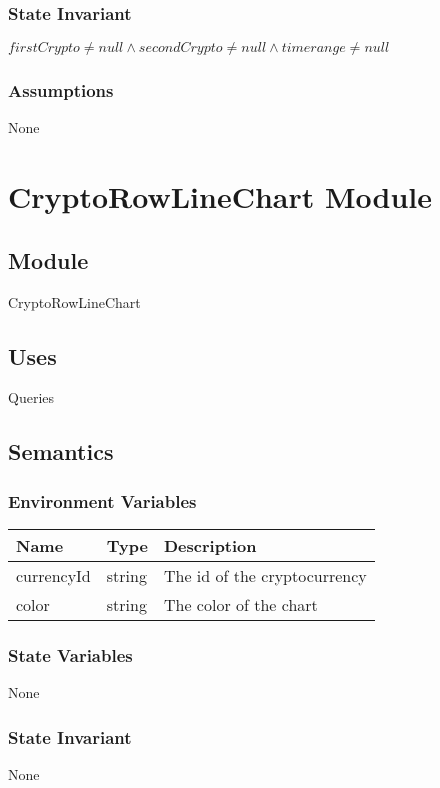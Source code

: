 \documentclass[12pt]{article}
\begin{document}
\subsubsection{State Invariant}
$firstCrypto \neq null \land
secondCrypto \neq null \land
timerange \neq null$

\subsubsection{Assumptions}
None

\newpage

\section{CryptoRowLineChart Module}

\subsection{Module}
CryptoRowLineChart

\subsection{Uses}
Queries

\subsection{Semantics}

\subsubsection{Environment Variables}
\begin{tabular}{| l | l | p{10cm} |}
    \hline
    \textbf{Name} & \textbf{Type} & \textbf{Description}\\ \hline
    currencyId & string & The id of the cryptocurrency\\ \hline
    color & string & The color of the chart\\ \hline
\end{tabular}

\subsubsection{State Variables}
None

\subsubsection{State Invariant}
None
\end{document}
